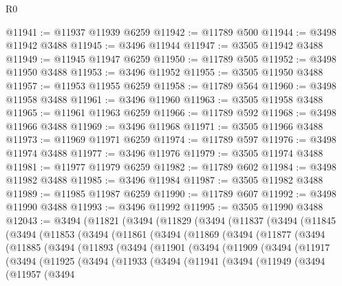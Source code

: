 \begin{lexlean}{R0}
\begin{coremodule}
@11941 := @11937 @11939 @6259
@11942 := @11789 @500
@11944 := @3498 @11942 @3488
@11945 := @3496 @11944
@11947 := @3505 @11942 @3488
@11949 := @11945 @11947 @6259
@11950 := @11789 @505
@11952 := @3498 @11950 @3488
@11953 := @3496 @11952
@11955 := @3505 @11950 @3488
@11957 := @11953 @11955 @6259
@11958 := @11789 @564
@11960 := @3498 @11958 @3488
@11961 := @3496 @11960
@11963 := @3505 @11958 @3488
@11965 := @11961 @11963 @6259
@11966 := @11789 @592
@11968 := @3498 @11966 @3488
@11969 := @3496 @11968
@11971 := @3505 @11966 @3488
@11973 := @11969 @11971 @6259
@11974 := @11789 @597
@11976 := @3498 @11974 @3488
@11977 := @3496 @11976
@11979 := @3505 @11974 @3488
@11981 := @11977 @11979 @6259
@11982 := @11789 @602
@11984 := @3498 @11982 @3488
@11985 := @3496 @11984
@11987 := @3505 @11982 @3488
@11989 := @11985 @11987 @6259
@11990 := @11789 @607
@11992 := @3498 @11990 @3488
@11993 := @3496 @11992
@11995 := @3505 @11990 @3488
@12043 := @3494
    (@11821
      (@3494
        (@11829
          (@3494
            (@11837
              (@3494
                (@11845
                  (@3494
                    (@11853
                      (@3494
                        (@11861
                          (@3494
                            (@11869
                              (@3494
                                (@11877
                                  (@3494
                                    (@11885
                                      (@3494
                                        (@11893
                                          (@3494
                                            (@11901
                                              (@3494
                                                (@11909
                                                  (@3494
                                                    (@11917
                                                      (@3494
                                                        (@11925
                                                          (@3494
                                                            (@11933
                                                              (@3494
                                                                (@11941
                                                                  (@3494
                                                                    (@11949
                                                                      (@3494
                                                                        (@11957
                                                                          (@3494

\end{coremodule}
\end{lexlean}
